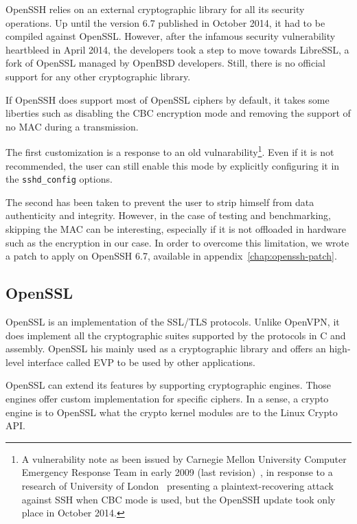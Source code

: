 OpenSSH relies on an external cryptographic library for all its security operations.
Up until the version 6.7 published in October 2014, it had to be compiled against OpenSSL.
However, after the infamous security vulnerability heartbleed in April 2014, the developers took a step to move towards LibreSSL, a fork of OpenSSL managed by OpenBSD  developers.
Still, there is no official support for any other cryptographic library.

If OpenSSH does support most of OpenSSL ciphers by default, it takes some liberties such as disabling the CBC encryption mode and removing the support of no MAC during a transmission.

\noindent The first customization is a response to an old vulnarability\footnote{A vulnerability note as been issued by Carnegie Mellon University Computer Emergency Response Team in early 2009 (last revision)~\cite{CERT2009}, in response to a research of University of London~\cite{Albrecht:2009} presenting a plaintext-recovering attack against SSH when CBC mode is used, but the OpenSSH update took only place in October 2014.}.
Even if it is not recommended, the user can still enable this mode by explicitly configuring it in the \texttt{sshd\_config} options.

\noindent The second has been taken to prevent the user to strip himself from data authenticity and integrity.
However, in the case of testing and benchmarking, skipping the MAC can be interesting, especially if it is not offloaded in hardware such as the encryption in our case.
In order to overcome this limitation, we wrote a patch to apply on OpenSSH 6.7, available in appendix~\ref{chap:openssh-patch}.




\subsection{OpenSSL}\label{sec:implem-openssl}

OpenSSL is an implementation of the SSL/TLS protocols.
Unlike OpenVPN, it does implement all the cryptographic suites supported by the protocols in C and assembly.
OpenSSL his mainly used as a cryptographic library and offers an high-level interface called EVP to be used by other applications.

OpenSSL can extend its features by supporting cryptographic engines.
Those engines offer custom implementation for specific ciphers.
In a sense, a crypto engine is to OpenSSL what the crypto kernel modules are to the Linux Crypto API.

